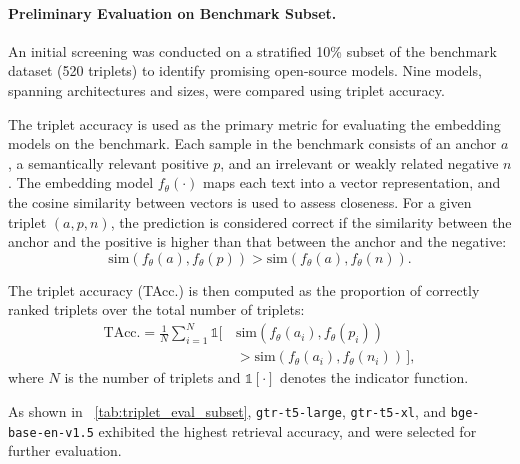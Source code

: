 \documentclass[a4paper,fleqn]{cas-dc}
\begin{document}
\paragraph{Preliminary Evaluation on Benchmark Subset.}  
An initial screening was conducted on a stratified 10\% subset of the benchmark dataset (520 triplets) to identify promising open-source models. Nine models, spanning architectures and sizes, were compared using triplet accuracy. 

The triplet accuracy is used as the primary metric for evaluating the embedding models on the benchmark. Each sample in the benchmark consists of an anchor $a$, a semantically relevant positive $p$, and an irrelevant or weakly related negative $n$. The embedding model $f_\theta(\cdot)$ maps each text into a vector representation, and the cosine similarity between vectors is used to assess closeness. For a given triplet $(a, p, n)$, the prediction is considered correct if the similarity between the anchor and the positive is higher than that between the anchor and the negative:
\begin{equation}
\text{sim}(f_\theta(a), f_\theta(p)) > \text{sim}(f_\theta(a), f_\theta(n)).
\end{equation}

The triplet accuracy (TAcc.) is then computed as the proportion of correctly ranked triplets over the total number of triplets:
\begin{equation}
\begin{split}
\text{TAcc.} = \frac{1}{N} \sum_{i=1}^{N} 
\mathbb{1} \big[\, &\text{sim}(f_\theta(a_i), f_\theta(p_i)) \\
&> \text{sim}(f_\theta(a_i), f_\theta(n_i)) \,\big],
\end{split}
\end{equation}
where $N$ is the number of triplets and $\mathbb{1}[\cdot]$ denotes the indicator function.

As shown in \tablename~\ref{tab:triplet_eval_subset}, \texttt{gtr-t5-large}, \texttt{gtr-t5-xl}, and \texttt{bge-base-en-v1.5} exhibited the highest retrieval accuracy, and were selected for further evaluation.
\end{document}
